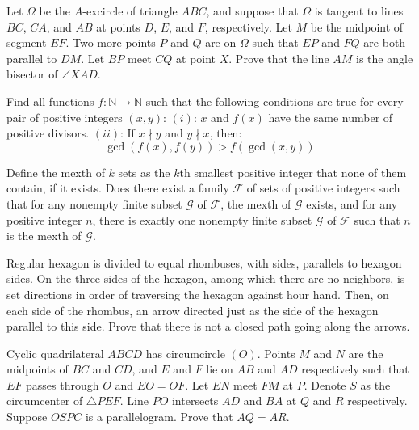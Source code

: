 \documentclass[11pt]{scrartcl}
\begin{document}
\begin{problem}[6566259136811987209]
	Let $\Omega$ be the $A$-excircle of triangle $ABC$, and suppose that $\Omega$ is tangent to lines $BC$, $CA$, and $AB$ at points $D$, $E$, and $F$, respectively. Let $M$ be the midpoint of segment $EF$. Two more points $P$ and $Q$ are on $\Omega$ such that $EP$ and $FQ$ are both parallel to $DM$. Let $BP$ meet $CQ$ at point $X$. Prove that the line $AM$ is the angle bisector of $\angle XAD$.
\end{problem}
\begin{problem}[6566978587694479725]
Find all functions $f : \mathbb{N} \rightarrow \mathbb{N}$ such that the following conditions are true for every pair of positive integers $(x, y)$:
$(i)$: $x$ and $f(x)$ have the same number of positive divisors.
$(ii)$: If $x \nmid y$ and $y \nmid x$, then:
$$\gcd(f(x), f(y)) > f(\gcd(x, y))$$
\end{problem}
\begin{problem}[6568001756330762063]
Define the mexth of \(k\) sets as the \(k\)th smallest positive integer that none of them contain, if it exists. Does there exist a family \(\mathcal F\) of sets of positive integers such that
for any nonempty finite subset \(\mathcal G\) of \(\mathcal F\), the mexth of \(\mathcal G\) exists, and
for any positive integer \(n\), there is exactly one nonempty finite subset \(\mathcal G\) of \(\mathcal F\) such that \(n\) is the mexth of \(\mathcal G\).
\end{problem}
\begin{problem}[6576585943791349484]
Regular hexagon is divided to equal rhombuses, with sides, parallels to hexagon sides. On the three sides of the hexagon, among which there are no neighbors, is set directions in order of traversing the hexagon against hour hand. Then, on each side of the rhombus, an arrow directed just as the side of the hexagon parallel to this side. Prove that there is not a closed path going along the arrows.
\end{problem}
\begin{problem}[6612845742708555351]
	Cyclic quadrilateral $ABCD$ has circumcircle $(O)$. Points $M$ and $N$ are the midpoints of $BC$ and $CD$, and $E$ and $F$ lie on $AB$ and $AD$ respectively such that $EF$ passes through $O$ and $EO=OF$. Let $EN$ meet $FM$ at $P$. Denote $S$ as the circumcenter of $\triangle PEF$. Line $PO$ intersects $AD$ and $BA$ at $Q$ and $R$ respectively. Suppose $OSPC$ is a parallelogram. Prove that $AQ=AR$.
\end{problem}
\end{document}
